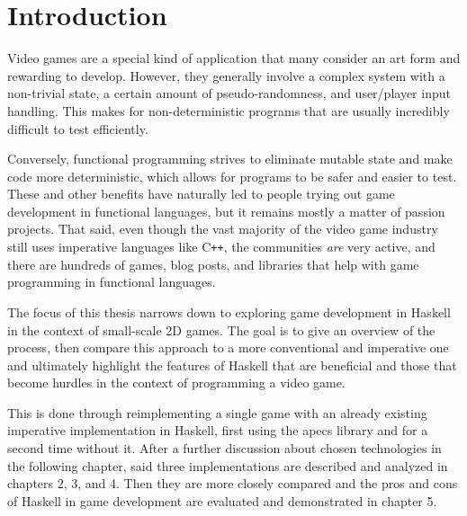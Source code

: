 \documentclass[
  digital, %
  color,   %
  table,   %
  oneside, %
  lof,     %
  lot,     %
]{fithesis3}
\newcommand{\cpp}{C\nolinebreak\texttt{+}\nolinebreak\texttt{+}}
\begin{document}
\chapter*{Introduction}
\label{chptr:introduction}


Video games are a special kind of application that many consider an art form
and rewarding to develop. However, they generally involve a complex system
with a non-trivial state, a certain amount of pseudo-randomness,
and user/player input handling. This makes for non-deterministic
programs that are usually incredibly difficult to test efficiently.

Conversely, functional programming strives to eliminate
mutable state and make code more deterministic, which allows for
programs to be safer and easier to test.
These and other benefits have naturally led to people
trying out game development in functional languages, but
it remains mostly a matter of passion projects.
That said, even though the vast majority of the video game industry
still uses imperative languages like \cpp{}, the communities
\emph{are} very active, and there are hundreds of games,
blog posts, and libraries that help with
game programming in functional languages.

The focus of this thesis narrows down to exploring game development
in Haskell in the context of small-scale 2D games. The goal is
to give an overview of the process, then compare this approach
to a more conventional and imperative one
and ultimately highlight the features of Haskell that are beneficial
and those that become hurdles in the context of programming a video game.

This is done through reimplementing a single game with an already existing
imperative implementation in Haskell,
first using the apecs library
and for a second time without it. After a further discussion
about chosen technologies in the following chapter,
said three implementations are described and analyzed
in chapters 2, 3, and 4. Then they are more closely compared
and the pros and cons of Haskell in game development are
evaluated and demonstrated in chapter 5.
\end{document}

